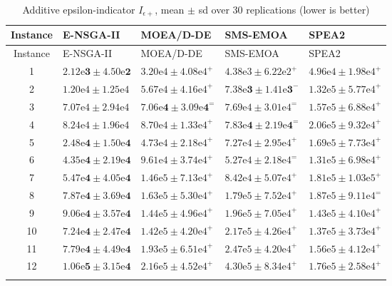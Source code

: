 \documentclass[11pt, a4paper]{article}
\begin{document}
\hypertarget{tab:Eps}{}
\begin{longtable}[!htb]{@{}cllll@{}}
\caption{Additive epsilon-indicator $I_{\epsilon+}$, mean $\pm$ sd over 30 replications (lower is better)}\tabularnewline
\toprule
Instance & E-NSGA-II & MOEA/D-DE & SMS-EMOA & SPEA2\tabularnewline
\midrule
\endfirsthead
\toprule
Instance & E-NSGA-II & MOEA/D-DE & SMS-EMOA & SPEA2\tabularnewline
\midrule
\endhead
1 & $\mathbf{2.12\mathrm{e}3 \pm 4.50\mathrm{e}2}$ & $3.20\mathrm{e}4 \pm 4.08\mathrm{e}4^{+}$ & $4.38\mathrm{e}3 \pm 6.22\mathrm{e}2^{+}$ & $4.96\mathrm{e}4 \pm 1.98\mathrm{e}4^{+}$\tabularnewline

2 & $1.20\mathrm{e}4 \pm 1.25\mathrm{e}4$ & $5.67\mathrm{e}4 \pm 4.16\mathrm{e}4^{+}$ & $\mathbf{7.38\mathrm{e}3 \pm 1.41\mathrm{e}3}^{-}$ & $1.32\mathrm{e}5 \pm 5.77\mathrm{e}4^{+}$\tabularnewline

3 & $7.07\mathrm{e}4 \pm 2.94\mathrm{e}4$ & $\mathbf{7.06\mathrm{e}4 \pm 3.09\mathrm{e}4^{=}}$ & $7.69\mathrm{e}4 \pm 3.01\mathrm{e}4^{=}$ & $1.57\mathrm{e}5 \pm 6.88\mathrm{e}4^{+}$\tabularnewline

4 & $8.24\mathrm{e}4 \pm 1.96\mathrm{e}4$ & $8.70\mathrm{e}4 \pm 1.33\mathrm{e}4^{+}$ & $\mathbf{7.83\mathrm{e}4 \pm 2.19\mathrm{e}4}^{=}$ & $2.06\mathrm{e}5 \pm 9.32\mathrm{e}4^{+}$\tabularnewline

5 & $\mathbf{2.48\mathrm{e}4 \pm 1.50\mathrm{e}4}$ & $4.73\mathrm{e}4 \pm 2.18\mathrm{e}4^{+}$ & $7.27\mathrm{e}4 \pm 2.95\mathrm{e}4^{+}$ & $1.69\mathrm{e}5 \pm 7.73\mathrm{e}4^{+}$\tabularnewline

6 & $\mathbf{4.35\mathrm{e}4 \pm 2.19\mathrm{e}4}$ & $9.61\mathrm{e}4 \pm 3.74\mathrm{e}4^{+}$ & $5.27\mathrm{e}4 \pm 2.18\mathrm{e}4^{=}$ & $1.31\mathrm{e}5 \pm 6.98\mathrm{e}4^{+}$\tabularnewline

7 & $\mathbf{5.47\mathrm{e}4 \pm 4.05\mathrm{e}4}$ & $1.46\mathrm{e}5 \pm 7.13\mathrm{e}4^{+}$ & $8.42\mathrm{e}4 \pm 5.07\mathrm{e}4^{+}$ & $1.81\mathrm{e}5 \pm 1.03\mathrm{e}5^{+}$\tabularnewline

8 & $\mathbf{7.87\mathrm{e}4 \pm 3.69\mathrm{e}4}$ & $1.63\mathrm{e}5 \pm 5.30\mathrm{e}4^{+}$ & $1.79\mathrm{e}5 \pm 7.52\mathrm{e}4^{+}$ & $1.87\mathrm{e}5 \pm 9.11\mathrm{e}4^{=}$\tabularnewline

9 & $\mathbf{9.06\mathrm{e}4 \pm 3.57\mathrm{e}4}$ & $1.44\mathrm{e}5 \pm 4.96\mathrm{e}4^{+}$ & $1.96\mathrm{e}5 \pm 7.05\mathrm{e}4^{+}$ & $1.43\mathrm{e}5 \pm 4.10\mathrm{e}4^{+}$\tabularnewline

10 & $\mathbf{7.24\mathrm{e}4 \pm 2.47\mathrm{e}4}$ & $1.42\mathrm{e}5 \pm 4.20\mathrm{e}4^{+}$ & $2.17\mathrm{e}5 \pm 4.26\mathrm{e}4^{+}$ & $1.37\mathrm{e}5 \pm 3.73\mathrm{e}4^{+}$\tabularnewline

11 & $\mathbf{7.79\mathrm{e}4 \pm 4.49\mathrm{e}4}$ & $1.93\mathrm{e}5 \pm 6.51\mathrm{e}4^{+}$ & $2.47\mathrm{e}5 \pm 4.20\mathrm{e}4^{+}$ & $1.56\mathrm{e}5 \pm 4.12\mathrm{e}4^{+}$\tabularnewline

12 & $\mathbf{1.06\mathrm{e}5 \pm 3.15\mathrm{e}4}$ & $2.16\mathrm{e}5 \pm 4.52\mathrm{e}4^{+}$ & $4.30\mathrm{e}5 \pm 8.34\mathrm{e}4^{+}$ & $1.76\mathrm{e}5 \pm 2.58\mathrm{e}4^{+}$\tabularnewline
\bottomrule
\label{tab:Eps}
\end{longtable}
\end{document}
